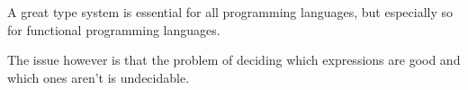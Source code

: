 A great type system is essential for all programming languages, but especially so for functional programming languages.

The issue however is that the problem of deciding which expressions are good and which ones aren't is undecidable.
